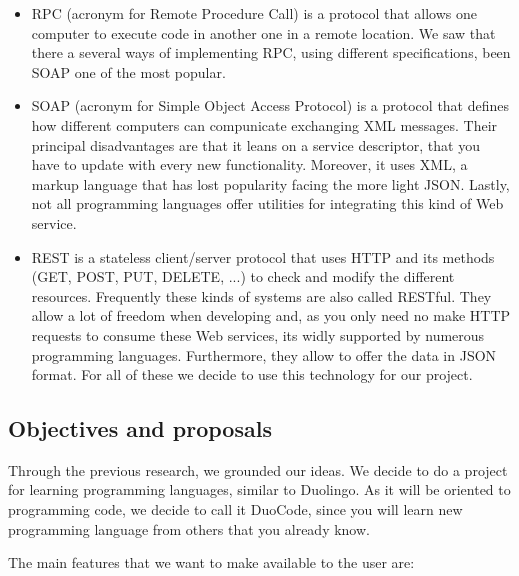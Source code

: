 \begin{itemize}
\item
RPC (acronym for Remote Procedure Call) is a protocol that allows one computer to execute code in another one in a remote location. We saw that there a several ways of implementing RPC, using different specifications, been SOAP one of the most popular.

\item
SOAP (acronym for Simple Object Access Protocol) is a protocol that defines how different computers can compunicate exchanging XML messages. Their principal disadvantages are that it leans on a service descriptor, that you have to update with every new functionality. Moreover, it uses XML, a markup language that has lost popularity facing the more light JSON. Lastly, not all programming languages offer utilities for integrating this kind of Web service.

\item
REST is a stateless client/server protocol that uses HTTP and its methods (GET, POST, PUT, DELETE, ...) to check and modify the different resources. Frequently these kinds of systems are also called RESTful. They allow a lot of freedom when developing and, as you only need no make HTTP requests to consume these Web services, its widly supported by numerous programming languages. Furthermore, they allow to offer the data in JSON format. For all of these we decide to use this technology for our project.

\end{itemize}

\subsection{Objectives and proposals\label{subsec:introductionEN}}

Through the previous research, we grounded our ideas. We decide to do a project for learning programming languages, similar to Duolingo. As it will be oriented to programming code, we decide to call it DuoCode, since you will learn new programming language from others that you already know.

The main features that we want to make available  to the user are:

